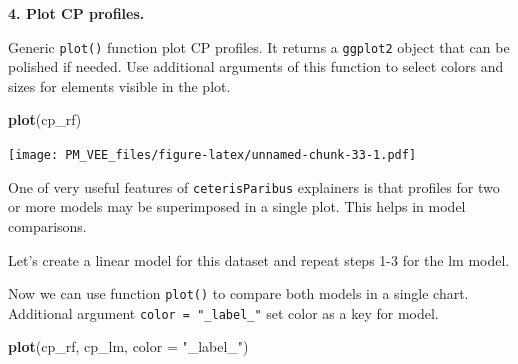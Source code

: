 \documentclass[]{krantz}
\newenvironment{Shaded}{\begin{snugshade}}{\end{snugshade}}
\newcommand{\DataTypeTok}[1]{\textcolor[rgb]{0.13,0.29,0.53}{#1}}
\newcommand{\KeywordTok}[1]{\textcolor[rgb]{0.13,0.29,0.53}{\textbf{#1}}}
\newcommand{\NormalTok}[1]{#1}
\newcommand{\OperatorTok}[1]{\textcolor[rgb]{0.81,0.36,0.00}{\textbf{#1}}}
\newcommand{\StringTok}[1]{\textcolor[rgb]{0.31,0.60,0.02}{#1}}
\theoremstyle{definition}
\theoremstyle{definition}
\theoremstyle{definition}
\theoremstyle{remark}
\begin{document}
\textbf{4. Plot CP profiles.}

Generic \texttt{plot()} function plot CP profiles. It returns a
\texttt{ggplot2} object that can be polished if needed. Use additional
arguments of this function to select colors and sizes for elements
visible in the plot.

\begin{Shaded}
\begin{Highlighting}[]
\KeywordTok{plot}\NormalTok{(cp_rf) }
\end{Highlighting}
\end{Shaded}

\texttt{[image: PM\_VEE\_files/figure-latex/unnamed-chunk-33-1.pdf]}

One of very useful features of \texttt{ceterisParibus} explainers is
that profiles for two or more models may be superimposed in a single
plot. This helps in model comparisons.

Let's create a linear model for this dataset and repeat steps 1-3 for
the lm model.

\begin{Shaded}
\end{Shaded}

Now we can use function \texttt{plot()} to compare both models in a
single chart. Additional argument \texttt{color\ =\ "\_label\_"} set
color as a key for model.

\begin{Shaded}
\begin{Highlighting}[]
\KeywordTok{plot}\NormalTok{(cp_rf, cp_lm, }\DataTypeTok{color =} \StringTok{"_label_"}\NormalTok{)}
\end{Highlighting}
\end{Shaded}
\end{document}
